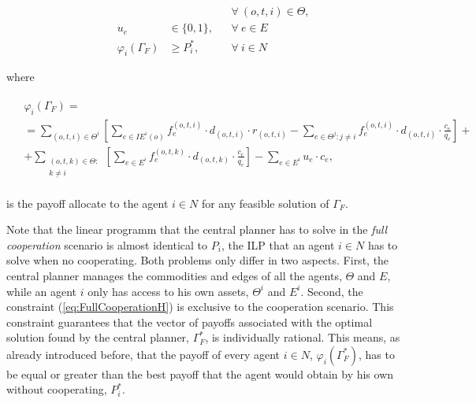 \documentclass[review]{elsarticle}
\begin{document}
\begin{subequations}
\begin{alignat}{3}
        &                         &                                                                           &                                        && \forall\ (o,t,i) \in \Theta, \label{eq:FullCooperationG} \\[1em]  
        &                         &  u_e                                                                      & \in \{0,1\},                           && \forall\ e \in E \\
        &                         & \varphi_i(\Gamma_F)                                                           & \geq P_i^*,     && \forall\ i\in N \label{eq:FullCooperationH}
    \end{alignat}
\end{subequations}

where 

\begin{align}
    \begin{split}
    & \varphi_i(\Gamma_F) = \\
    & = \sum_{(o,t,i)\in \Theta^i} \left[ \sum_{e \in IE^i(o)} f_e^{(o,t,i)} \cdot d_{(o,t,i)} \cdot r_{(o,t,i)} -  \sum_{e\in \Theta^j \colon j\not = i} f_e^{(o,t,i)} \cdot d_{(o,t,i)} \cdot \frac{c_e}{q_e} \right] + \\
    & + \sum_{\substack{(o,t,k) \in \Theta  \colon \\ k \not = i}} \left[\sum_{e \in E^i} f_e^{(o,t,k)} \cdot d_{(o,t,k)} \cdot \frac{c_e}{q_e}\right] - \sum_{e \in E^i} u_e \cdot c_e, \label{eq:FullCooperationPayoff}
    \end{split}
\end{align}

is the payoff allocate to the agent $i\in N$ for any feasible solution
of $\Gamma_F$.

Note that the linear programm that the central planner has to solve in the
\emph{full cooperation} scenario is almost identical to $P_ i$, the ILP that an
agent $i\in N$ has to solve when no cooperating. Both problems only differ in
two aspects. First,  the central planner manages the commodities and edges of
all the agents, $\Theta$ and $E$, while an agent $i$ only has access to his own
assets, $\Theta^i$ and $E^i$. Second, the constraint (\ref{eq:FullCooperationH})
is exclusive to the cooperation scenario. This constraint  guarantees that the
vector of payoffs associated with the optimal solution found by the central
planner, $\Gamma_F^*$, is individually rational. This means, as already
introduced before, that the payoff of every agent $i \in N$, $\varphi_i(\Gamma_F^*)$,
has to be equal or greater than the best payoff that the agent would obtain by his own without
cooperating, $P_i^*$.
\end{document}
